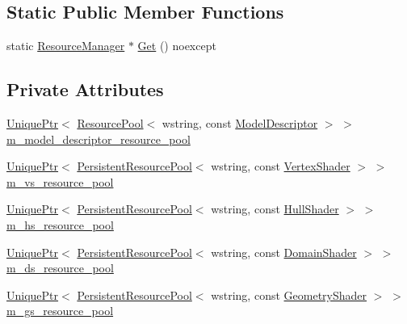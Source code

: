 \subsection*{Static Public Member Functions}
\begin{DoxyCompactItemize}
\item 
static \hyperlink{classmage_1_1_resource_manager}{Resource\+Manager} $\ast$ \hyperlink{classmage_1_1_resource_manager_a1e6ca77d892578fc4df0e62dfbc807f6}{Get} () noexcept
\end{DoxyCompactItemize}
\subsection*{Private Attributes}
\begin{DoxyCompactItemize}
\item 
\hyperlink{namespacemage_a3316d7143a973e37adf1110f2e80ca31}{Unique\+Ptr}$<$ \hyperlink{classmage_1_1_resource_pool}{Resource\+Pool}$<$ wstring, const \hyperlink{classmage_1_1_model_descriptor}{Model\+Descriptor} $>$ $>$ \hyperlink{classmage_1_1_resource_manager_a57aab278f875724e43b48a9e9885ccea}{m\+\_\+model\+\_\+descriptor\+\_\+resource\+\_\+pool}
\item 
\hyperlink{namespacemage_a3316d7143a973e37adf1110f2e80ca31}{Unique\+Ptr}$<$ \hyperlink{classmage_1_1_persistent_resource_pool}{Persistent\+Resource\+Pool}$<$ wstring, const \hyperlink{classmage_1_1_vertex_shader}{Vertex\+Shader} $>$ $>$ \hyperlink{classmage_1_1_resource_manager_a6f0d2bfba2cbf0586572d100ee06c7f7}{m\+\_\+vs\+\_\+resource\+\_\+pool}
\item 
\hyperlink{namespacemage_a3316d7143a973e37adf1110f2e80ca31}{Unique\+Ptr}$<$ \hyperlink{classmage_1_1_persistent_resource_pool}{Persistent\+Resource\+Pool}$<$ wstring, const \hyperlink{namespacemage_a6705043f61391313d099f89ee3cc94ee}{Hull\+Shader} $>$ $>$ \hyperlink{classmage_1_1_resource_manager_a8f5118a694baef442f467ef8658f93b6}{m\+\_\+hs\+\_\+resource\+\_\+pool}
\item 
\hyperlink{namespacemage_a3316d7143a973e37adf1110f2e80ca31}{Unique\+Ptr}$<$ \hyperlink{classmage_1_1_persistent_resource_pool}{Persistent\+Resource\+Pool}$<$ wstring, const \hyperlink{namespacemage_ad5d9bb50a2b73d471275badcd9b2f155}{Domain\+Shader} $>$ $>$ \hyperlink{classmage_1_1_resource_manager_aa58be0018fe4f93182927a84bca407f4}{m\+\_\+ds\+\_\+resource\+\_\+pool}
\item 
\hyperlink{namespacemage_a3316d7143a973e37adf1110f2e80ca31}{Unique\+Ptr}$<$ \hyperlink{classmage_1_1_persistent_resource_pool}{Persistent\+Resource\+Pool}$<$ wstring, const \hyperlink{namespacemage_abb3c4ec904feaa4f076ab736f6bab40f}{Geometry\+Shader} $>$ $>$ \hyperlink{classmage_1_1_resource_manager_a2b0c4dfc6473c6c8aa9a0f3ebc30c1dd}{m\+\_\+gs\+\_\+resource\+\_\+pool}

\end{DoxyCompactItemize}
